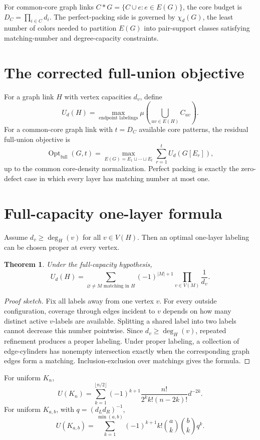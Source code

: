 \documentclass[11pt]{article}
\newtheorem{theorem}{Theorem}
\begin{document}
For common-core graph links $C*G=\{C\cup e:e\in E(G)\}$, the core budget is $D_C=\prod_{i\in C}d_i$. The perfect-packing side is governed by $\chi_d(G)$, the least number of colors needed to partition $E(G)$ into pair-support classes satisfying matching-number and degree-capacity constraints.

\section{The corrected full-union objective}
For a graph link $H$ with vertex capacities $d_v$, define
\[
U_d(H)=\max_{\text{endpoint labelings}}\mu\left(\bigcup_{uv\in E(H)}C_{uv}\right).
\]
For a common-core graph link with $t=D_C$ available core patterns, the residual full-union objective is
\[
\operatorname{Opt}_{\mathrm{full}}(G,t)=\max_{E(G)=E_1\sqcup\cdots\sqcup E_t}\sum_{r=1}^t U_d(G[E_r]),
\]
up to the common core-density normalization. Perfect packing is exactly the zero-defect case in which every layer has matching number at most one.

\section{Full-capacity one-layer formula}
Assume $d_v\ge \deg_H(v)$ for all $v\in V(H)$. Then an optimal one-layer labeling can be chosen proper at every vertex.
\begin{theorem}
Under the full-capacity hypothesis,
\[
U_d(H)=\sum_{\varnothing\ne M\text{ matching in }H}(-1)^{|M|+1}\prod_{v\in V(M)}\frac1{d_v}.
\]
\end{theorem}
\begin{proof}[Proof sketch]
Fix all labels away from one vertex $v$. For every outside configuration, coverage through edges incident to $v$ depends on how many distinct active $v$-labels are available. Splitting a shared label into two labels cannot decrease this number pointwise. Since $d_v\ge\deg_H(v)$, repeated refinement produces a proper labeling. Under proper labeling, a collection of edge-cylinders has nonempty intersection exactly when the corresponding graph edges form a matching. Inclusion-exclusion over matchings gives the formula.
\end{proof}
For uniform $K_n$,
\[
U(K_n)=\sum_{k=1}^{\lfloor n/2\rfloor}(-1)^{k+1}\frac{n!}{2^k k!(n-2k)!}d^{-2k}.
\]
For uniform $K_{a,b}$, with $q=(d_Ld_R)^{-1}$,
\[
U(K_{a,b})=\sum_{k=1}^{\min(a,b)}(-1)^{k+1}k!\binom ak\binom bkq^k.
\]
\end{document}
